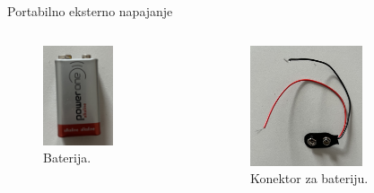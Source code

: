 \documentclass[aspectratio=169,xcolor=dvipsnames]{beamer}
\begin{document}
\begin{frame}{Portabilno eksterno napajanje}
	\begin{columns}[c]
    \begin{column}{.45\textwidth}
    \begin{figure}
        \centering
        \includegraphics[width=0.6\textwidth]{master_fig/baterija2.jpeg}
        \caption{Baterija.}
    \end{figure}      
    \end{column}
    \begin{column}{.55\textwidth}
    \begin{figure}
        \centering
        \includegraphics[width=0.65\textwidth]{master_fig/konektor3.jpeg}
        \caption{Konektor za bateriju.}
    \end{figure}
    \end{column}
\end{columns}
\end{frame}
\end{document}
